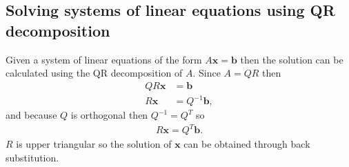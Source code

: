 \documentclass[letterpaper,10pt,english]{jupyterBook}
\begin{document}
\subsection{Solving systems of linear equations using QR decomposition}
\label{\detokenize{6_Direct_methods/6.4_QR_decomposition:solving-systems-of-linear-equations-using-qr-decomposition}}\label{\detokenize{6_Direct_methods/6.4_QR_decomposition:qr-crout-section}}
\sphinxAtStartPar
Given a system of linear equations of the form \(A\mathbf{x}=\mathbf{b}\) then the solution can be calculated using the QR decomposition of \(A\). Since \(A=QR\) then
\begin{align*}
    QR\mathbf{x} &= \mathbf{b}\\
    R\mathbf{x} &= Q^{-1} \mathbf{b},
\end{align*}
\sphinxAtStartPar
and because \(Q\) is orthogonal then \(Q^{-1}=Q^T\) so
\begin{align*}
    R\mathbf{x} = Q^T \mathbf{b}.
\end{align*}
\sphinxAtStartPar
\(R\) is upper triangular so the solution of \(\mathbf{x}\) can be obtained through back substitution.
\end{document}
